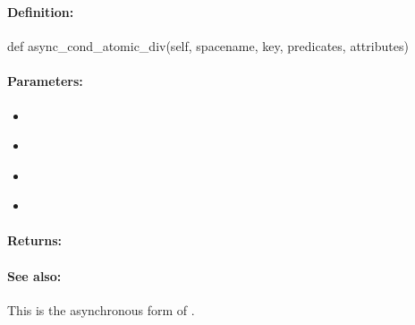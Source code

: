 \pagebreak
\subsubsection{}
\label{api:python:async_cond_atomic_div}


\paragraph{Definition:}
\begin{pythoncode}
def async_cond_atomic_div(self, spacename, key, predicates, attributes)
\end{pythoncode}

\paragraph{Parameters:}
\begin{itemize}[noitemsep]
\item {}\\

\item {}\\

\item {}\\

\item {}\\

\end{itemize}

\paragraph{Returns:}


\paragraph{See also:}  This is the asynchronous form of .

\pagebreak
\subsubsection{}
\label{api:python:atomic_mod}


